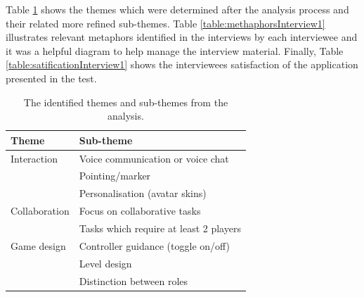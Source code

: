 Table \ref{table:themesInterview1} shows the themes which were determined after the analysis process and their related more refined sub-themes.  Table \ref{table:methaphorsInterview1} illustrates relevant metaphors identified in the interviews by each interviewee and it was a helpful diagram to help manage the interview material. Finally, Table \ref{table:satificationInterview1} shows the interviewees satisfaction of the application presented in the test.     

\begin{table}[!h]
      \centering
        \begin{tabular}{ll}
        \toprule
        Theme & Sub-theme \\
        \midrule
        Interaction & Voice communication or voice chat\\
        & Pointing/marker \\\vspace{0.2cm}
        & Personalisation (avatar skins) \\
        Collaboration & Focus on collaborative tasks \\\vspace{0.2cm}
        & Tasks which require at least 2 players \\
        Game design & Controller guidance (toggle on/off)\\
        & Level design\\
        & Distinction between roles\\
        \bottomrule
        \end{tabular}
        \caption{The identified themes and sub-themes from the analysis.}
        \label{table:themesInterview1}
\end{table}



